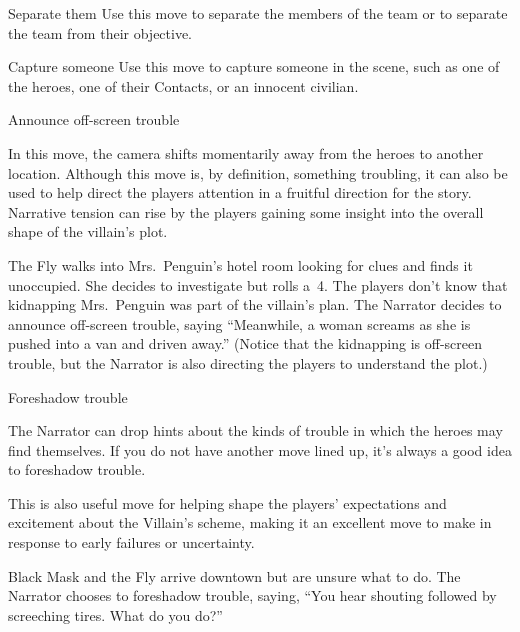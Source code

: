 
\begin{narratormove}{Separate them}
{
  Use this move to separate the members of the team or to separate
  the team from their objective.
}
\end{narratormove}

\begin{narratormove}{Capture someone}
{
  Use this move to capture someone in the scene,
  such as one of the heroes, one of their Contacts,
  or an innocent civilian.
}
\end{narratormove}

\begin{narratormove}{Announce off-screen trouble}
{
  In this move, the camera shifts momentarily away from the heroes
  to another location.
  Although this move is, by definition, something troubling, it can also
  be used to help direct the players attention in a fruitful
  direction for the story.
  Narrative tension can rise by the players gaining some insight
  into the overall shape of the villain's plot.

  \begin{example}
    The Fly walks into Mrs.\ Penguin's hotel room looking for clues
    and finds it unoccupied. She decides to investigate but rolls
    a~4. The players don't know that kidnapping Mrs.\ Penguin was
    part of the villain's plan. The Narrator decides to announce
    off-screen trouble, saying ``Meanwhile, a woman screams as she
    is pushed into a van and driven away.''
    (Notice that the kidnapping is off-screen trouble,
    but the Narrator is also directing the players to understand
    the plot.)
  \end{example}
}
\end{narratormove}

\begin{narratormove}{Foreshadow trouble}
{
  The Narrator can drop hints about the kinds of trouble
  in which the heroes may find themselves.
  If you do not have another move lined up, it's always a good
  idea to foreshadow trouble.
  
  This is also useful move for helping shape the players'
  expectations and excitement about the Villain's scheme,
  making it an excellent move to make in response to early
  failures or uncertainty.

  \begin{example}
    Black Mask and the Fly arrive downtown but are unsure what to do.
    The Narrator chooses
    to foreshadow trouble, saying, ``You hear shouting followed
    by screeching tires. What do you do?''
  \end{example}
}
\end{narratormove}

